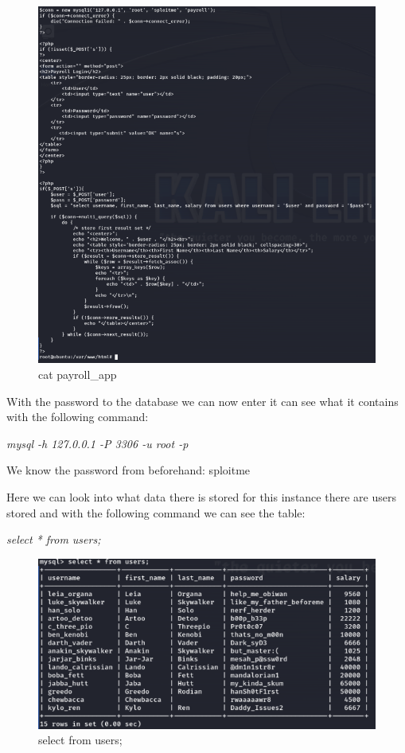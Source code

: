 \begin{figure}[H]
    \centering
    \includegraphics[width=\linewidth]{pic/cat payroll_app.png}
    \caption{cat payroll\_app}
    \label{fig:cat payroll_app}
\end{figure}

With the password to the database we can now enter it can see what it contains with the
following command:

\textit{mysql -h 127.0.0.1 -P 3306 -u root -p}

We know the password from beforehand: sploitme

Here we can look into what data there is stored for this instance there are users stored and
with the following command we can see the table:

\textit{select * from users;}

\begin{figure}[H]
    \centering
    \includegraphics[width=0.8\linewidth]{pic/select from users;.png}
    \caption{select from users;}
    \label{fig:select from users;}
\end{figure}


